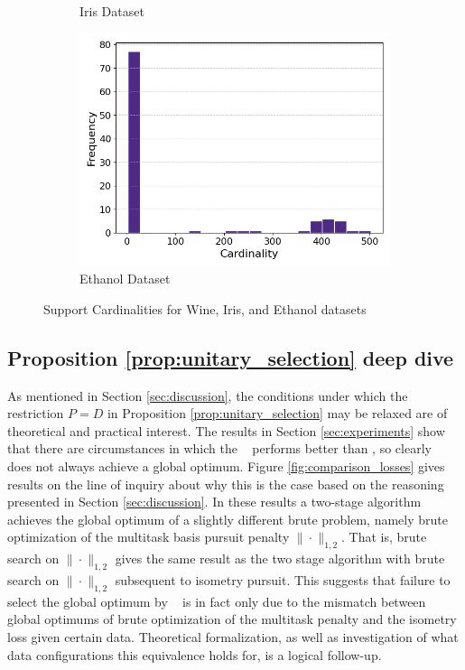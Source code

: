 \begin{figure}[t]
\begin{subfigure}[b]{0.3\textwidth}
        \caption{Iris Dataset}
        \label{fig:iris_cardinalities}
    \end{subfigure}
    \hfill
    \begin{subfigure}[b]{0.3\textwidth}
        \centering
        \includegraphics[width=\textwidth]{../figures/ethanol_cardinalities}
        \caption{Ethanol Dataset}
        \label{fig:ethanol_cardinalities}
    \end{subfigure}
    \caption{Support Cardinalities for Wine, Iris, and Ethanol datasets}
    \label{fig:support_cardinalities}
\end{figure}

\newpage

\subsection{Proposition \ref{prop:unitary_selection} deep dive}
\label{sec:deep_dive}

As mentioned in Section \ref{sec:discussion}, the conditions under which the restriction $P=D$ in Proposition \ref{prop:unitary_selection} may be relaxed are of theoretical and practical interest.
The results in Section \ref{sec:experiments} show that there are circumstances in which the \greedy~ performs better than \tsip, so clearly \tsip~ does not always achieve a global optimum.
Figure \ref{fig:comparison_losses} gives results on the line of inquiry about why this is the case based on the reasoning presented in Section \ref{sec:discussion}.
In these results a two-stage algorithm achieves the global optimum of a slightly different brute problem, namely brute optimization of the multitask basis pursuit penalty $\|\cdot \|_{1,2}$.
That is, brute search on $\|\cdot \|_{1,2}$ gives the same result as the two stage algorithm with brute search on $\|\cdot \|_{1,2}$ subsequent to isometry pursuit.
This suggests that failure to select the global optimum by \tsip~ is in fact only due to the mismatch between global optimums of brute optimization of the multitask penalty and the isometry loss given certain data.
Theoretical formalization, as well as investigation of what data configurations this equivalence holds for, is a logical follow-up.


